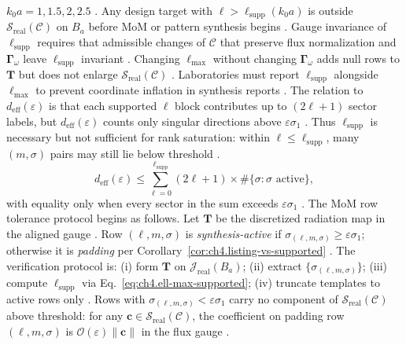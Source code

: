 \(k_{0}a=1,1.5,2,2.5\) \cite{hansen1988}. Any design target with \(\ell>\ell_{\mathrm{supp}}(k_{0}a)\) is outside
\(\mathcal{S}_{\mathrm{real}}(\mathcal{C})\) on \(B_{a}\) before MoM or pattern synthesis begins \cite{stratton1941}.
Gauge invariance of \(\ell_{\mathrm{supp}}\) requires that admissible changes of \(\mathcal{C}\) that preserve flux normalization and \(\boldsymbol{\Gamma}_\omega\) leave \(\ell_{\mathrm{supp}}\)
invariant \cite{hansen1988}. Changing \(\ell_{\max}\) without changing \(\boldsymbol{\Gamma}_\omega\) adds null rows to
\(\mathbf{T}\) but does not enlarge \(\mathcal{S}_{\mathrm{real}}(\mathcal{C})\) \cite{harrington2001}. Laboratories must
report \(\ell_{\mathrm{supp}}\) alongside \(\ell_{\max}\) to prevent coordinate inflation in synthesis reports \cite{hansen1988}.
The relation to \(d_{\mathrm{eff}}(\varepsilon)\) is that each supported \(\ell\) block contributes up to \((2\ell+1)\) sector labels, but \(d_{\mathrm{eff}}(\varepsilon)\) counts only singular
directions above \(\varepsilon\sigma_{1}\) \cite{harrington2001}. Thus \(\ell_{\mathrm{supp}}\) is necessary but not sufficient
for rank saturation: within \(\ell\le\ell_{\mathrm{supp}}\), many \((m,\sigma)\) pairs may still lie below threshold
\cite{hansen1988}.
\begin{equation}
\label{eq:ch4.ell-deff-relation}
d_{\mathrm{eff}}(\varepsilon)\le\sum_{\ell=0}^{\ell_{\mathrm{supp}}}(2\ell+1)\times\#\{\sigma:\sigma\text{ active}\},
\end{equation}
with equality only when every sector in the sum exceeds \(\varepsilon\sigma_{1}\) \cite{harrington2001}.
The MoM row tolerance protocol begins as follows. Let \(\mathbf{T}\) be the discretized radiation map in the aligned gauge \cite{harrington2001}. Row \( (\ell,m,\sigma)\) is \emph{synthesis-active}
if \(\sigma_{(\ell,m,\sigma)}\ge\varepsilon\sigma_{1}\); otherwise it is \emph{padding} per Corollary~\ref{cor:ch4.listing-vs-supported}
\cite{hansen1988}. The verification protocol is: (i) form \(\mathbf{T}\) on \(\mathcal{J}_{\mathrm{real}}(B_{a})\); (ii) extract
\(\{\sigma_{(\ell,m,\sigma)}\}\); (iii) compute \(\ell_{\mathrm{supp}}\) via Eq.~\eqref{eq:ch4.ell-max-supported}; (iv) truncate templates to
active rows only \cite{stratton1941}. 
\label{thm:ch4.padding-invisible}
Rows with \(\sigma_{(\ell,m,\sigma)}<\varepsilon\sigma_{1}\) carry no component of \(\mathcal{S}_{\mathrm{real}}(\mathcal{C})\) above
threshold: for any \(\mathbf{c}\in\mathcal{S}_{\mathrm{real}}(\mathcal{C})\), the coefficient on padding row \((\ell,m,\sigma)\) is
\(\mathcal{O}(\varepsilon)\|\mathbf{c}\|\) in the flux gauge \cite{harrington2001}.
